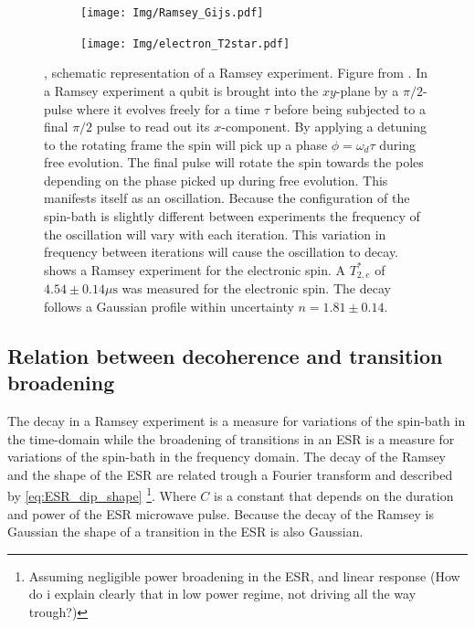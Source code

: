 \begin{figure}[htbp]
    \centering
    \begin{subfigure}[t]{0.49\textwidth}\centering
        \caption{}
        \texttt{[image: Img/Ramsey\_Gijs.pdf]}
        \label{fig:Ramsey_gijs}
    \end{subfigure}
    \begin{subfigure}[t]{0.49\textwidth}\centering
        \caption{}
        \texttt{[image: Img/electron\_T2star.pdf]}
        \label{fig:electron_T2*}
    \end{subfigure}
        \caption{
        , schematic representation of a Ramsey experiment. Figure from \citet{Lange2012Quantum}.
        In a Ramsey experiment a qubit is brought into the $xy$-plane by a $\pi/2$-pulse where it evolves freely for a time $\tau$ before being subjected to a final $\pi/2$ pulse to read out its $x$-component.
        By applying a detuning to the rotating frame the spin will pick up a phase $\phi = \omega_d \tau$ during free evolution.
        The final pulse will rotate the spin towards the poles depending on the phase picked up during free evolution.
        This manifests itself as an oscillation.
        Because the configuration of the spin-bath is slightly different between experiments the frequency of the oscillation will vary with each iteration.
        This variation in frequency between iterations will cause the oscillation to decay.
         shows a Ramsey experiment for the electronic spin.
        A $T_{2,e}^*$ of $4.54 \pm 0.14 \mu\mathrm{s}$ was measured for the electronic spin. The decay follows a Gaussian profile within uncertainty $n = 1.81 \pm 0.14$. }
\end{figure}


\subsection{Relation between decoherence and transition broadening}
The decay in a Ramsey experiment is a measure for variations of the spin-bath in the time-domain while the broadening of transitions in an ESR is a measure for variations of the spin-bath in the frequency domain.
The decay of the Ramsey and the shape of the ESR are related trough a Fourier transform and described by \cref{eq:ESR_dip_shape} \footnote{Assuming negligible power broadening in the ESR, and linear response (How do i explain clearly that in low power regime, not driving all the way trough?)}.
Where $C$ is a constant that depends on the duration and power of the ESR microwave pulse.
Because the decay of the Ramsey is Gaussian the shape of a transition in the ESR is also Gaussian.

